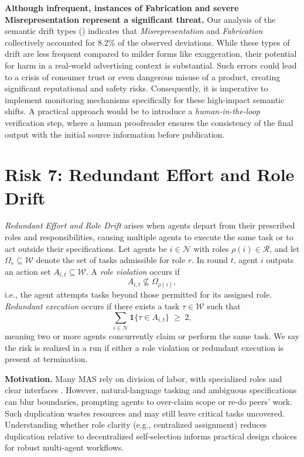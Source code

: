 \documentclass[11pt, letterpaper, shortlabels]{berkeley}
\let\Cref\crtCref
\begin{document}
{\textbf{Although infrequent, instances of Fabrication and severe Misrepresentation represent a significant threat.} Our analysis of the semantic drift types (\Cref{fig:Semantic_Drift}) indicates that \textit{Misrepresentation} and \textit{Fabrication} collectively accounted for 8.2\% of the observed deviations. While these types of drift are less frequent compared to milder forms like exaggeration, their potential for harm in a real-world advertising context is substantial. Such errors could lead to a crisis of consumer trust or even dangerous misuse of a product, creating significant reputational and safety risks. Consequently, it is imperative to implement monitoring mechanisms specifically for these high-impact semantic shifts. A practical approach would be to introduce a \textit{human-in-the-loop} verification step, where a human proofreader ensures the consistency of the final output with the initial source information before publication.



\section{Risk 7: Redundant Effort and Role Drift}
\label{sec:role-violation-duplication}

\begin{boxE}
\textit{Redundant Effort and Role Drift} arises when agents depart from their prescribed roles and responsibilities, causing multiple agents to execute the same task or to act outside their specifications. Let agents be $i \in \mathcal{N}$ with roles $\rho(i) \in \mathcal{R}$, and let $\Omega_r \subseteq \mathcal{W}$ denote the set of tasks admissible for role $r$. In round $t$, agent $i$ outputs an action set $A_{i,t} \subseteq \mathcal{W}$. A \emph{role violation} occurs if
\[
A_{i,t} \not\subseteq \Omega_{\rho(i)},
\]
i.e., the agent attempts tasks beyond those permitted for its assigned role. \emph{Redundant execution} occurs if there exists a task $\tau \in \mathcal{W}$ such that
\[
\sum_{i \in \mathcal{N}} \mathbf{1}\{\tau \in A_{i,t}\} \;\ge\; 2,
\]
meaning two or more agents concurrently claim or perform the same task. We say the risk is realized in a run if either a role violation or redundant execution is present at termination.
\end{boxE}

\textbf{Motivation.} Many MAS rely on division of labor, with specialized roles and clear interfaces \citep{wang2025dyflow}. However, natural-language tasking and ambiguous specifications can blur boundaries, prompting agents to over-claim scope or re-do peers’ work. Such duplication wastes resources and may still leave critical tasks uncovered. Understanding whether role clarity (e.g., centralized assignment) reduces duplication relative to decentralized self-selection informs practical design choices for robust multi-agent workflows.


}
\end{document}
